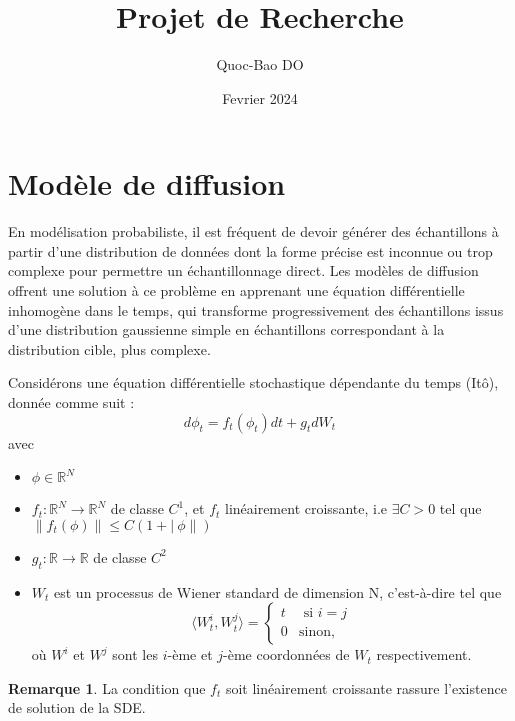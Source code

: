 \documentclass[a4paper,10pt]{article}
\title{Projet de Recherche}
\author{Quoc-Bao DO}
\date{Fevrier 2024}
\theoremstyle{definition} %
\theoremstyle{definition} %
\theoremstyle{definition} %
\theoremstyle{definition} %
\newtheorem{remark}[definition]{Remarque}
\newcommand{\R}{\mathbb{R}}
\begin{document}
\maketitle

\section{Modèle de diffusion}

    En modélisation probabiliste, il est fréquent de devoir générer des échantillons à partir d'une distribution de données dont la forme précise est inconnue ou trop complexe pour permettre un échantillonnage direct. Les modèles de diffusion offrent une solution à ce problème en apprenant une équation différentielle inhomogène dans le temps, qui transforme progressivement des échantillons issus d'une distribution gaussienne simple en échantillons correspondant à la distribution cible, plus complexe.

Considérons une équation différentielle stochastique dépendante du temps (Itô), donnée comme suit :
    \begin{equation}\label{eq:SDE}
         d\phi_t = f_t(\phi_t)dt + g_tdW_t
    \end{equation}
    avec 
    \begin{itemize}
        \item $\phi \in \R^N$
        \item $f_t:\R^N \rightarrow \R^N$ de classe $C^1$, et $f_t$ linéairement croissante, i.e $\exists C > 0$ tel que $\|f_t(\phi)\| \leq C(1+|\ \phi \|)$
        \item $g_t : \R \rightarrow \R$ de classe $C^2$
        \item $W_t$ est un processus de Wiener standard de dimension N, c'est-à-dire tel que 
            \begin{equation*}
                \langle W_t^i, W_t^j \rangle =
                    \begin{cases}    
                        t & \textrm{ si } i=j \\
                        0 & \textrm{sinon},
                    \end{cases}
            \end{equation*}
            où $W^i$ et $W^j$ sont les $i$-ème et $j$-ème coordonnées de $W_t$ respectivement. 
    \end{itemize}
    \begin{remark}
        La condition que $f_t$ soit linéairement croissante rassure l'existence de solution de la SDE.
    \end{remark}
\end{document}
